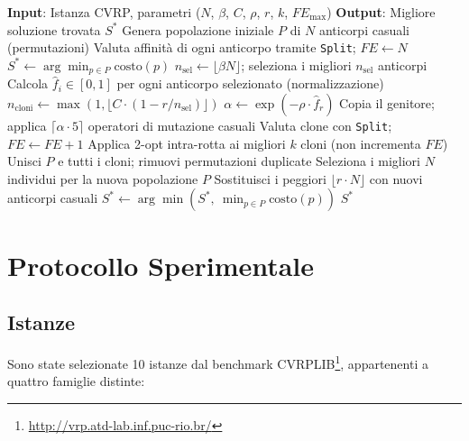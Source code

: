\documentclass[a4paper,12pt]{article}
\begin{document}
\begin{algorithm}[H]
\caption{CLONALG per CVRP}
\begin{algorithmic}[1]
\State \textbf{Input}: Istanza CVRP, parametri ($N$, $\beta$, $C$, $\rho$, $r$, $k$, $FE_{\max}$)
\State \textbf{Output}: Migliore soluzione trovata $S^*$
\State Genera popolazione iniziale $P$ di $N$ anticorpi casuali (permutazioni)
\State Valuta affinità di ogni anticorpo tramite \texttt{Split}; $FE \gets N$
\State $S^* \gets \arg\min_{p \in P} \text{costo}(p)$
    \State $n_{\text{sel}} \gets \lfloor \beta N \rfloor$; seleziona i migliori $n_{\text{sel}}$ anticorpi
    \State Calcola $\hat{f}_i \in [0,1]$ per ogni anticorpo selezionato (normalizzazione)
        \State $n_{\text{cloni}} \gets \max(1, \lfloor C \cdot (1 - r/n_{\text{sel}}) \rfloor)$ 
        \State $\alpha \gets \exp(-\rho \cdot \hat{f}_r)$ 
            \State Copia il genitore; applica $\lceil \alpha \cdot 5 \rceil$ operatori di mutazione casuali
            \State Valuta clone con \texttt{Split}; $FE \gets FE + 1$
        \EndFor
    \EndFor
    \State Applica 2-opt intra-rotta ai migliori $k$ cloni (non incrementa $FE$)
    \State Unisci $P$ e tutti i cloni; rimuovi permutazioni duplicate
    \State Seleziona i migliori $N$ individui per la nuova popolazione $P$
    \State Sostituisci i peggiori $\lfloor r \cdot N \rfloor$ con nuovi anticorpi casuali
    \State $S^* \gets \arg\min(S^*,\ \min_{p \in P} \text{costo}(p))$
\EndWhile
\State \Return $S^*$
\end{algorithmic}
\end{algorithm}


\section{Protocollo Sperimentale}

\subsection{Istanze}

Sono state selezionate 10 istanze dal benchmark CVRPLIB\footnote{\url{http://vrp.atd-lab.inf.puc-rio.br/}}, appartenenti a quattro famiglie distinte:
\end{document}
